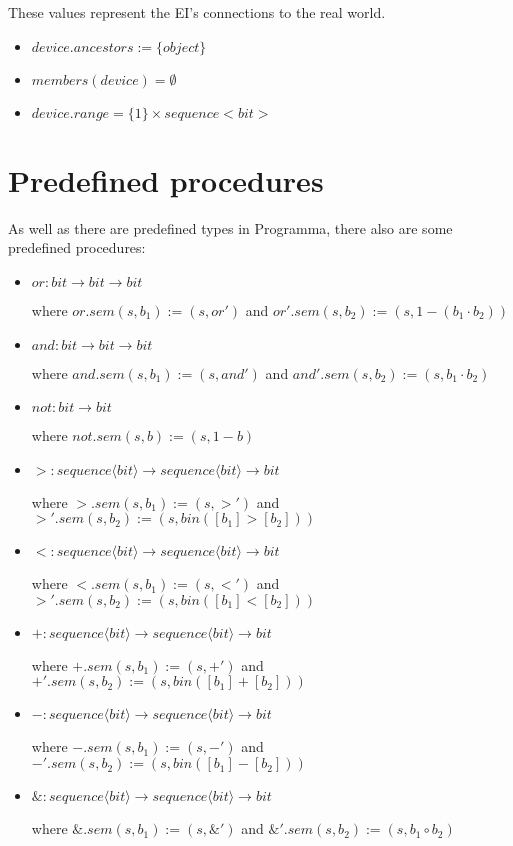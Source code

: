 These values represent the EI's connections to the real world.


\begin{itemize}
\item $device.ancestors := \lbrace object \rbrace$
\item $members(device) = \emptyset$
\item $device.range = \lbrace 1 \rbrace \times sequence<bit>$
\end{itemize}


\section{Predefined procedures}

As well as there are predefined types in Programma, there also are some predefined procedures:

\begin{itemize}
\item $or : bit \rightarrow bit \rightarrow bit$ 

where $or.sem(s, b_1) := (s, or')$ and $or'.sem(s, b_2) := (s, 1 - (b_1 \cdot b_2))$

\item $and : bit \rightarrow bit \rightarrow bit$ 

where $and.sem(s, b_1) := (s, and')$ and $and'.sem(s, b_2) := (s, b_1 \cdot b_2)$

\item $not : bit \rightarrow bit$ 

where $not.sem(s, b) := (s, 1 - b)$

\item $> : sequence \langle bit \rangle \rightarrow sequence \langle bit \rangle \rightarrow bit$ 

where $>.sem(s, b_1) := (s, >')$ and $>'.sem(s, b_2) := (s, bin([b_1] > [b_2]))$

\item $< : sequence \langle bit \rangle \rightarrow sequence \langle bit \rangle \rightarrow bit$ 

where $<.sem(s, b_1) := (s, <')$ and $>'.sem(s, b_2) := (s, bin([b_1] < [b_2]))$

\item $+ : sequence \langle bit \rangle \rightarrow sequence \langle bit \rangle \rightarrow bit$ 

where $+.sem(s, b_1) := (s, +')$ and $+'.sem(s, b_2) := (s, bin([b_1] + [b_2]))$

\item $- : sequence \langle bit \rangle \rightarrow sequence \langle bit \rangle \rightarrow bit$ 

where $-.sem(s, b_1) := (s, -')$ and $-'.sem(s, b_2) := (s, bin([b_1] - [b_2]))$

\item $\& : sequence \langle bit \rangle \rightarrow sequence \langle bit \rangle \rightarrow bit$ 

where $\&.sem(s, b_1) := (s, \&')$ and $\&'.sem(s, b_2) := (s, b_1 \circ b_2)$
\end{itemize}